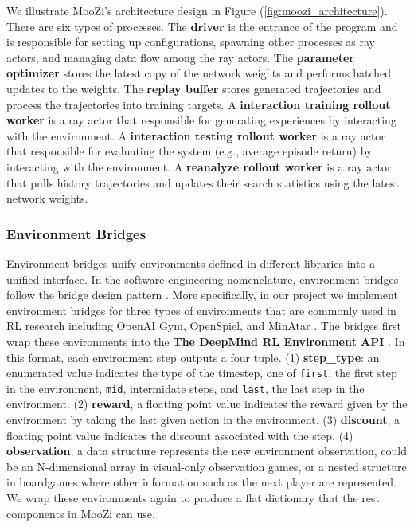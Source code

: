 \documentclass[12pt]{article}
\begin{document}
We illustrate MooZi's architecture design in Figure (\ref{fig:moozi_architecture}).
There are six types of processes.
The \textbf{driver} is the entrance of the program and is responsible for setting up configurations,
spawning other processes as ray actors, and managing data flow among the ray actors.
The \textbf{parameter optimizer} stores the latest copy of the network weights and performs batched updates to the weights.
The \textbf{replay buffer} stores generated trajectories and process the trajectories into training targets.
A \textbf{interaction training rollout worker} is a ray actor that responsible for generating experiences by interacting with the environment.
A \textbf{interaction testing rollout worker} is a ray actor that responsible for evaluating the system (e.g., average episode return) by interacting with the environment.
A \textbf{reanalyze rollout worker} is a ray actor that pulls history trajectories and updates their search statistics using the latest network weights.

\subsubsection{Environment Bridges} \label{sec:env_bridge}
Environment bridges unify environments defined in different libraries into a unified interface.
In the software engineering nomenclature, environment bridges follow the bridge design pattern \cite{BridgePattern__2022}.
More specifically, in our project we implement environment bridges for three types of environments that are commonly used in RL research including OpenAI Gym, OpenSpiel, and MinAtar \cite{OpenAIGym_Brockman.Cheung.ea_2016,OpenSpielFrameworkReinforcement_Lanctot.Lockhart.ea_2020,MinAtarAtariInspiredTestbed_Young.Tian_2019}.
The bridges first wrap these environments into the \textbf{The DeepMind RL Environment API} \cite{DmEnvDeepMind__2022}.
In this format, each environment step outputs a four tuple.
(1) \textbf{step\_type}: an enumerated value indicates the type of the timestep, one of \Verb|first|, the first step in the environment, \Verb|mid|, intermidate steps, and \Verb|last|, the last step in the environment.
(2) \textbf{reward}, a floating point value indicates the reward given by the environment by taking the last given action in the environment.
(3) \textbf{discount}, a floating point value indicates the discount associated with the step.
(4) \textbf{observation}, a data structure represents the new environment observation, could be an N-dimensional array in visual-only observation games, or a nested structure in boardgames where other information such as the next player are represented.
We wrap these environments again to produce a flat dictionary that the rest components in MooZi can use.
\end{document}
